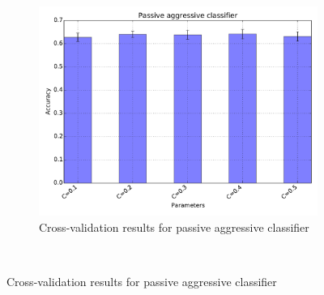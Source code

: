 \documentclass{article}
\begin{document}
\begin{figure}[h!]
  \centering
  \begin{subfigure}{0.66\textwidth}
    \centering
    \includegraphics[width=\textwidth]{Images/Passive_aggressive.pdf}
    \caption{Cross-validation results for passive aggressive classifier}
    \label{fig:classifiers-passive-aggressive}
  \end{subfigure} \\
\end{figure}
\end{document}
